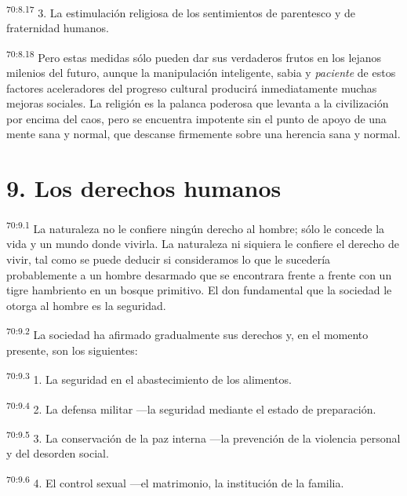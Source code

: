 \documentclass[twoside, 11pt]{book}
\begin{document}
\par
\textsuperscript{70:8.17} 3. La estimulación religiosa de los sentimientos de parentesco y de fraternidad humanos.

\par
\textsuperscript{70:8.18} Pero estas medidas sólo pueden dar sus verdaderos frutos en los lejanos milenios del futuro, aunque la manipulación inteligente, sabia y \textit{paciente} de estos factores aceleradores del progreso cultural producirá inmediatamente muchas mejoras sociales. La religión es la palanca poderosa que levanta a la civilización por encima del caos, pero se encuentra impotente sin el punto de apoyo de una mente sana y normal, que descanse firmemente sobre una herencia sana y normal.

\section*{9. Los derechos humanos}
\par
\textsuperscript{70:9.1} La naturaleza no le confiere ningún derecho al hombre; sólo le concede la vida y un mundo donde vivirla. La naturaleza ni siquiera le confiere el derecho de vivir, tal como se puede deducir si consideramos lo que le sucedería probablemente a un hombre desarmado que se encontrara frente a frente con un tigre hambriento en un bosque primitivo. El don fundamental que la sociedad le otorga al hombre es la seguridad.

\par
\textsuperscript{70:9.2} La sociedad ha afirmado gradualmente sus derechos y, en el momento presente, son los siguientes:

\par
\textsuperscript{70:9.3} 1. La seguridad en el abastecimiento de los alimentos.

\par
\textsuperscript{70:9.4} 2. La defensa militar ---la seguridad mediante el estado de preparación.

\par
\textsuperscript{70:9.5} 3. La conservación de la paz interna ---la prevención de la violencia personal y del desorden social.

\par
\textsuperscript{70:9.6} 4. El control sexual ---el matrimonio, la institución de la familia.
\end{document}
